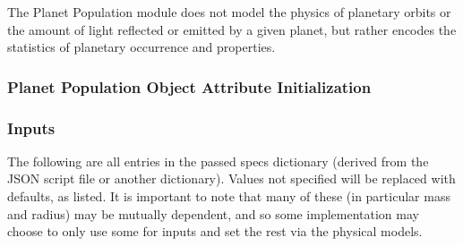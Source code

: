 \documentclass[cleanfoot]{asme2ej}
\begin{document}
The Planet Population module does not model the physics of planetary orbits or the amount of light reflected or emitted by a given planet, but rather encodes the statistics of planetary occurrence and properties. 

\label{sec:planetpopulation}
\subsubsection{Planet Population Object Attribute Initialization} 
\subsubsection*{Inputs}
The following are all entries in the passed specs dictionary (derived from the JSON script file or another dictionary).  Values not specified will be replaced with defaults, as listed.  It is important to note that many of these (in particular mass and radius) may be mutually dependent, and so some implementation may choose to only use some for inputs and set the rest via the physical models.
\end{document}

